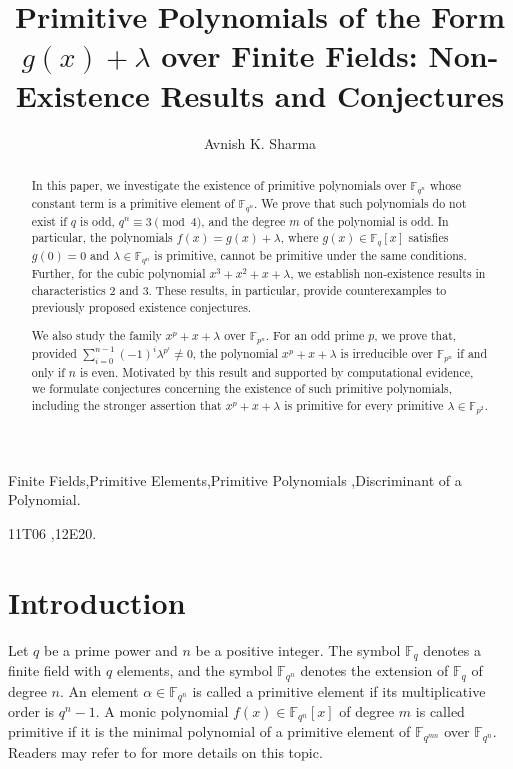 \documentclass[preprint,12pt]{elsarticle}
\begin{document}
	\sloppy
	\begin{frontmatter}
		\title{Primitive Polynomials of the Form $g(x)+\lambda$ over Finite Fields: Non-Existence Results and Conjectures}
		  \author[]{Avnish K. Sharma}
		\address{Department of Mathematics, Shri Ram College of Commerce, University of Delhi, New Delhi-110007, India}

\begin{abstract}
        In this paper, we investigate the existence of primitive polynomials over $\mathbb{F}_{q^n}$ whose constant term is a primitive element of $\mathbb{F}_{q^n}$. We prove that such polynomials do not exist if $q$ is odd, $q^n\equiv3\pmod{4}$, and the degree $m$ of the polynomial is odd. In particular, the polynomials $f(x)=g(x)+\lambda$, where $g(x)\in\mathbb{F}_q[x]$ satisfies $g(0)=0$ and $\lambda\in\mathbb{F}_{q^n}$ is primitive, cannot be primitive under the same conditions. Further, for the cubic polynomial $x^3+x^2+x+\lambda$, we establish non-existence results in characteristics $2$ and $3$. These results, in particular, provide counterexamples to previously proposed existence conjectures.

        We also study the family $x^p+x+\lambda$ over $\mathbb{F}_{p^n}$. For an odd prime $p$, we prove that, provided $\sum_{i=0}^{n-1}(-1)^i\lambda^{p^i}\neq0$, the polynomial $x^p+x+\lambda$ is irreducible over $\mathbb{F}_{p^n}$ if and only if $n$ is even. Motivated by this result and supported by computational evidence, we formulate conjectures concerning the existence of such primitive polynomials, including the stronger assertion that $x^p+x+\lambda$ is primitive for every primitive $\lambda\in\mathbb{F}_{p^2}$.
\end{abstract}
		
\begin{keyword}
	Finite Fields\sep Primitive Elements\sep Primitive Polynomials \sep Discriminant of a Polynomial.
			
    \MSC[$2020$] 11T06 \sep 12E20.
\end{keyword}	

\end{frontmatter}

\section{Introduction}\label{S1}

       Let $q$ be a prime power and $n$ be a positive integer. The symbol $\mathbb{F}_{q}$ denotes a finite field with $q$ elements, and the symbol $\mathbb{F}_{q^n}$ denotes the extension of $\mathbb{F}_{q}$ of degree $n$. An element $\alpha\in\mathbb{F}_{q^n}$ is called a primitive element if its multiplicative order is $q^n-1$. A monic polynomial $f(x)\in\mathbb{F}_{q^n}[x]$ of degree $m$ is called primitive if it is the minimal polynomial of a primitive element of $\mathbb{F}_{q^{mn}}$ over $\mathbb{F}_{q^n}$. Readers may refer to \cite{Nieder} for more details on this topic.
       
\end{document}

